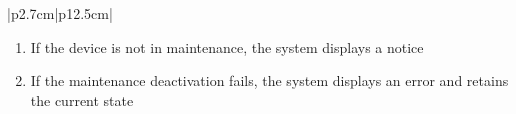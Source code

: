 \begin{table}[H]
\begin{tabular}{|p{2.7cm}|p{12.5cm}|}
\begin{minipage}[t]{\linewidth}
\begin{enumerate}[topsep=0pt,itemsep=1pt,parsep=0pt,partopsep=0pt]
                                          \item If the device is not in maintenance, the system displays a notice
                                          \item If the maintenance deactivation fails, the system displays an error and retains
                                                the current state
                                      \end{enumerate}
                                  \end{minipage}   \\
        \hline
    \end{tabular}
    \label{tab:admin-disable-usb-maintenance}
\end{table}

